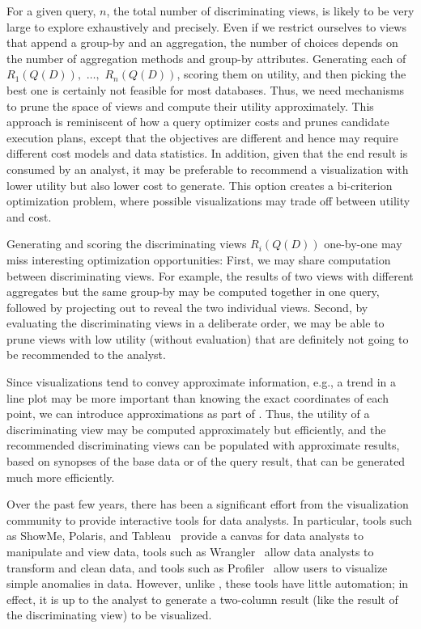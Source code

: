 \documentclass{sig-alternate}
\begin{document}
\begin{denselist}

\item For a given query, $n$, the total number of discriminating views, is likely to be very large to explore exhaustively and precisely. Even if we restrict ourselves to views that append a group-by and an aggregation, the number of choices depends on the number of aggregation methods and group-by attributes. Generating each of $R_1(Q(D)),$  $\ldots,$ $R_n(Q(D))$, scoring them on utility, and then picking the best one is certainly not feasible for most databases. Thus, we need mechanisms to prune the space of views and compute their utility approximately. This approach is reminiscent of how a query optimizer costs and prunes candidate execution plans, except that the objectives are different and hence may require different cost models and data statistics. In addition, given that the end result is consumed by an analyst, it may be preferable to recommend a visualization with lower utility but also lower cost to generate. This option creates a bi-criterion optimization problem, where possible visualizations may trade off between utility and cost.

\item Generating and scoring the discriminating views $R_i(Q(D))$ one-by-one may miss interesting optimization opportunities: First, we may share computation between discriminating views.  For example,
the results of two views with different aggregates but the same group-by may be computed together in one query, followed by projecting out to reveal the two individual views.  Second, by evaluating the discriminating views in a deliberate order, we may be able to prune views with
low utility (without evaluation) that are definitely not going to be recommended to the analyst.

\item Since visualizations tend to convey approximate information, e.g., a trend in a line plot may be more important than knowing the exact coordinates of each point, we can introduce approximations as part of \VizRecDB.  Thus, the utility of a discriminating view may be computed approximately but efficiently, and the recommended discriminating views can be populated with approximate results, based on synopses of the base data or of the query result, that can be generated much more efficiently.

\end{denselist}

\noindent Over the past few years, there has been a significant
effort from the visualization community to provide interactive tools
for data analysts. In particular, tools such as ShowMe, Polaris, and
Tableau~\cite{DBLP:journals/cacm/StolteTH08,
  DBLP:journals/tvcg/MackinlayHS07} provide a canvas for data analysts
to manipulate and view data, tools such as
Wrangler~\cite{DBLP:conf/chi/KandelPHH11} allow data analysts to
transform and clean data, and tools such as
Profiler~\cite{DBLP:conf/avi/KandelPPHH12} allow users to visualize
simple anomalies in data.  However, unlike \VizRecDB, these tools have
little automation; in effect, it is up to the analyst to generate a
two-column result (like the result of the discriminating view)
to be visualized.
\end{document}
